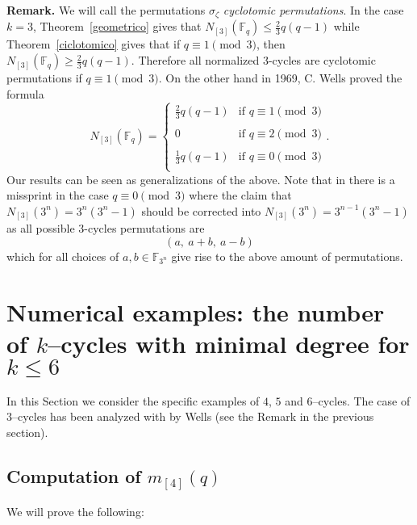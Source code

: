 \documentclass[a4paper,twoside]{article}
\begin{document}
\noindent\textbf{Remark.} We will call the permutations
$\sigma_\zeta$ \textit{cyclotomic permutations}. In the case
$k=3$, Theorem~\ref{geometrico} gives that $N_{[3]}(\mathbb
F_q)\leq \frac{2}{3}q(q-1)$ while Theorem~\ref{ciclotomico} gives
that if $q\equiv1\pmod 3$, then $N_{[3]}(\mathbb
F_q)\geq\frac{2}{3}q(q-1)$. Therefore all normalized $3$-cycles
are cyclotomic permutations if $q\equiv1\pmod3$. On the other hand
in 1969, C. Wells \cite{W} proved the formula
\begin{equation}\label{wello}
N_{[3]}(\mathbb F_q)=
\left\{\begin{array}{lr}
\frac{2}{3}q(q-1) & \textrm{if\ } q\equiv1\pmod3\\
& \\
0 & \textrm{if\ } q\equiv2\pmod3\\
& \\
\frac{1}{3}q(q-1) & \textrm{if\ } q\equiv0\pmod3\\
\end{array}\right..
\end{equation}
Our results can be seen as generalizations of the above. Note that
in \cite[page 50]{W}  there is a missprint in the case
$q\equiv0\pmod3$ where the claim that $N_{[3]}(3^n)=3^n(3^n-1)$
should be corrected into $N_{[3]}(3^n)=3^{n-1}(3^n-1)$ as all
possible $3$-cycles permutations are
$$(a,\ a+b,\ a-b)$$
which for all choices of $a, b\in\mathbb F_{3^n}$ give rise to the
above amount of permutations.

\section{Numerical examples: the number of $k$--cycles with minimal degree for $k\leq 6$}

In this Section we consider the specific examples of $4$, $5$ and
$6$--cycles. The case of $3$--cycles has been analyzed with by
Wells \cite{W} (see the Remark in the previous section).

\subsection{Computation of $m_{[4]}(q)$}

We will prove the following:
\end{document}
